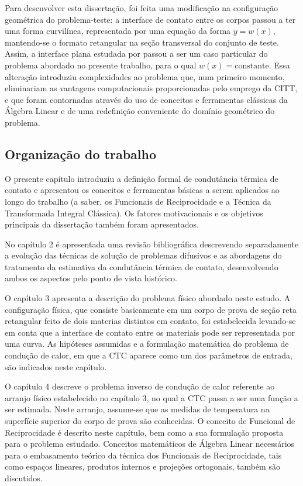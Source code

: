 Para desenvolver esta dissertação, foi feita uma modificação na configuração geométrica do problema-teste: a interface de contato entre os corpos passou a
ter uma forma curvilínea, representada por uma equação da forma $y = w(x)$, mantendo-se o formato retangular na seção transversal do conjunto
de teste. Assim, a interface plana estudada por \cite{tese_padilha} passou a ser um caso particular do problema abordado no presente trabalho, para
o qual $w(x) = \text{constante}$. Essa alteração introduziu complexidades ao problema que, num primeiro momento, eliminariam as vantagens computacionais
proporcionadas pelo emprego da CITT, e que foram contornadas através do uso de conceitos e ferramentas clássicas da Álgebra Linear e de uma redefinição conveniente
do domínio geométrico do problema.

\subsection{Organização do trabalho}

O presente capítulo introduziu a definição formal de condutância térmica de contato e apresentou os conceitos e ferramentas básicas a serem aplicados ao longo do trabalho (a saber, os Funcionais de Reciprocidade e a Técnica da Transformada Integral Clássica). Os fatores motivacionais e os objetivos principais da dissertação também foram apresentados.

No capítulo 2 é apresentada uma revisão bibliográfica descrevendo separadamente a evolução das técnicas de solução de problemas difusivos e as abordagens do tratamento da estimativa da condutância térmica de contato, desenvolvendo ambos os aspectos pelo ponto de vista histórico.

O capítulo 3 apresenta a descrição do problema físico abordado neste estudo. A configuração física, que consiste basicamente em um corpo de prova de seção reta retangular feito de dois materias distintos em contato, foi estabelecida levando-se em conta que a interface de contato entre os materiais pode ser representada por uma curva. As hipóteses assumidas e a formulação matemática do problema de condução de calor, em que a CTC aparece como um dos parâmetros de entrada, são indicados neste capítulo.

O capítulo 4 descreve o problema inverso de condução de calor referente ao arranjo físico estabelecido no capítulo 3, no qual a CTC passa a ser uma função a ser estimada. Neste arranjo, assume-se que as medidas de temperatura na superfície superior do corpo de prova são conhecidas. O conceito de Funcional de Reciprocidade é descrito neste capítulo, bem como a sua formulação proposta para o problema estudado. Conceitos matemáticos de Álgebra Linear necessários para o embasamento teórico da técnica dos Funcionais de Reciprocidade, tais como espaços lineares, produtos internos e projeções ortogonais, também são discutidos.

